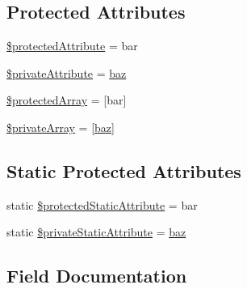 \subsection*{Protected Attributes}
\begin{DoxyCompactItemize}
\item 
\mbox{\hyperlink{class_class_with_non_public_attributes_ac68c122a0c087c3985653db8ba70b059}{\$protected\+Attribute}} = \textquotesingle{}bar\textquotesingle{}
\item 
\mbox{\hyperlink{class_class_with_non_public_attributes_af72e1b8a8372ac12257ec0909381d54d}{\$private\+Attribute}} = \textquotesingle{}\mbox{\hyperlink{source__with__oneline__annotations_8php_ae7a58e6eb64e3fa0d88ff421f558d8f4}{baz}}\textquotesingle{}
\item 
\mbox{\hyperlink{class_class_with_non_public_attributes_a2389c6f8e2b45935036424fb59c10689}{\$protected\+Array}} = \mbox{[}\textquotesingle{}bar\textquotesingle{}\mbox{]}
\item 
\mbox{\hyperlink{class_class_with_non_public_attributes_ab6a080dc1b987bd1e54e62cd4cb91a5e}{\$private\+Array}} = \mbox{[}\textquotesingle{}\mbox{\hyperlink{source__with__oneline__annotations_8php_ae7a58e6eb64e3fa0d88ff421f558d8f4}{baz}}\textquotesingle{}\mbox{]}
\end{DoxyCompactItemize}
\subsection*{Static Protected Attributes}
\begin{DoxyCompactItemize}
\item 
static \mbox{\hyperlink{class_class_with_non_public_attributes_a204bd2a423c9f1c3d84adef7aa2517d8}{\$protected\+Static\+Attribute}} = \textquotesingle{}bar\textquotesingle{}
\item 
static \mbox{\hyperlink{class_class_with_non_public_attributes_ab7207e129e3b78e22f192e61518d8d4b}{\$private\+Static\+Attribute}} = \textquotesingle{}\mbox{\hyperlink{source__with__oneline__annotations_8php_ae7a58e6eb64e3fa0d88ff421f558d8f4}{baz}}\textquotesingle{}
\end{DoxyCompactItemize}


\subsection{Field Documentation}
\mbox{\label{class_class_with_non_public_attributes_ab669d165b99e23bf90d68a0a057f69ac}} 
